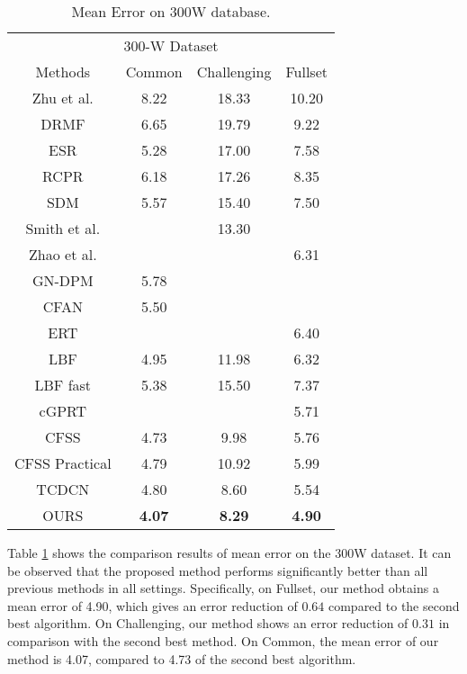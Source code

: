 \documentclass[journal]{IEEEtran}
\begin{document}
\begin{table}[h]
\small
    \centering \caption{Mean Error on 300W database. }
    \begin{tabular}{c c c c}
        \hline
  \multicolumn{4}{c}{300-W Dataset}\\
 Methods & Common & Challenging & Fullset \\
        \hline
 Zhu et al. & 8.22 & 18.33 & 10.20 \\

  DRMF & 6.65 & 19.79 & 9.22 \\

  ESR & 5.28 & 17.00 & 7.58  \\

  RCPR & 6.18 & 17.26 & 8.35 \\

  SDM & 5.57 & 15.40 & 7.50 \\
  Smith et al. & & 13.30 & \\

  Zhao et al. & &  & 6.31 \\

 GN-DPM & 5.78 & &\\

 CFAN  & 5.50 & & \\

 ERT& & & 6.40 \\

 LBF  & 4.95 & 11.98 & 6.32 \\

 LBF fast  & 5.38 & 15.50 & 7.37 \\

 cGPRT  &  &  & 5.71 \\

 CFSS & 4.73 & 9.98 & 5.76 \\

  CFSS Practical & 4.79 & 10.92 & 5.99 \\
  TCDCN & 4.80 & 8.60 & 5.54 \\
 \hline

 OURS & \textbf{4.07} &  \textbf{8.29} & \textbf{4.90}\\
 \hline
        \end{tabular}
    \label{mean_error_300w}
\end{table}

Table \ref{mean_error_300w} shows the comparison results of mean error on the 300W dataset. It can be observed that the proposed method performs significantly better than all previous methods in all settings. Specifically, on Fullset, our method obtains a mean error of 4.90, which gives an error reduction of $0.64$ compared to the second best algorithm. On Challenging, our method shows an error reduction of $0.31$ in comparison with the second best method. On Common, the mean error of our method is 4.07, compared to 4.73 of the second best algorithm.
\end{document}
